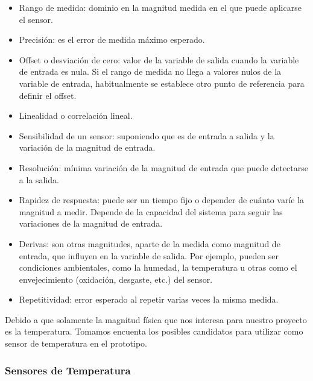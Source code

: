 \begin{itemize}
	
	\item Rango de medida: dominio en la magnitud medida en el que puede aplicarse el sensor.
	
	\item Precisión: es el error de medida máximo esperado.
	
	\item Offset o desviación de cero:  valor de la variable de salida cuando la variable de entrada es nula. Si el rango de medida no llega a valores nulos de la variable de entrada, habitualmente se establece otro punto de referencia para definir el offset.
	
	\item Linealidad o correlación lineal.
	
	\item Sensibilidad de un sensor: suponiendo que es de entrada a salida y la variación de la magnitud de entrada.
	
	\item Resolución: mínima variación de la magnitud de entrada que puede detectarse a la salida.
	
	\item Rapidez de respuesta: puede ser un tiempo fijo o depender de cuánto varíe la magnitud a medir. Depende de la capacidad del sistema para seguir las variaciones de la magnitud de entrada.
	
	\item Derivas: son otras magnitudes, aparte de la medida como magnitud de entrada, que influyen en la variable de salida. Por ejemplo, pueden ser condiciones ambientales, como la humedad, la temperatura u otras como el envejecimiento (oxidación, desgaste, etc.) del sensor.
	
	\item Repetitividad: error esperado al repetir varias veces la misma medida.
	
\end{itemize}

\par \noindent
Debido a que solamente la magnitud física que nos interesa para nuestro proyecto es la temperatura. Tomamos encuenta los posibles candidatos para utilizar como sensor de temperatura en el prototipo.

\subsubsection{Sensores de Temperatura}	


